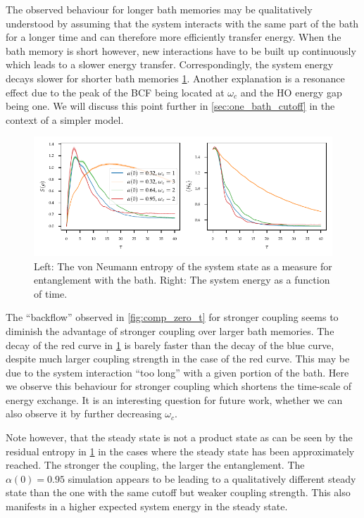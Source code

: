 The observed behaviour for longer bath memories may be qualitatively
understood by assuming that the system interacts with the same part of
the bath for a longer time and can therefore more efficiently transfer
energy. When the bath memory is short however, new interactions have
to be built up continuously which leads to a slower energy
transfer. Correspondingly, the system energy decays slower for shorter
bath memories \cref{fig:ho_zero_entropy}. Another explanation is a
resonance effect due to the peak of the BCF being located at \(ω_c\)
and the HO energy gap being one. We will discuss this point further in
\cref{sec:one_bath_cutoff} in the context of a simpler model.

\begin{figure}[h]
  \centering
  \includegraphics{figs/analytic_comp/entropy_zero.pdf}
  \caption{\label{fig:ho_zero_entropy} Left: The von Neumann entropy
    of the system state as a measure for entanglement with the
    bath. Right: The system energy as a function of time.}
\end{figure}
The ``backflow'' observed in \cref{fig:comp_zero_t} for stronger
coupling seems to diminish the advantage of stronger coupling over
larger bath memories. The decay of the red curve in
\cref{fig:ho_zero_entropy} is barely faster than the decay of the blue
curve, despite much larger coupling strength in the case of the red
curve. This may be due to the system interaction ``too long'' with a
given portion of the bath. Here we observe this behaviour for stronger
coupling which shortens the time-scale of energy exchange. It is an
interesting question for future work, whether we can also observe it
by further decreasing \(ω_c\).

Note however, that the steady state is not a product state as can be
seen by the residual entropy in \cref{fig:ho_zero_entropy} in the
cases where the steady state has been approximately reached. The
stronger the coupling, the larger the entanglement. The \(α(0)=0.95\)
simulation appears to be leading to a qualitatively different steady
state than the one with the same cutoff but weaker coupling
strength. This also manifests in a higher expected system energy in
the steady state.

